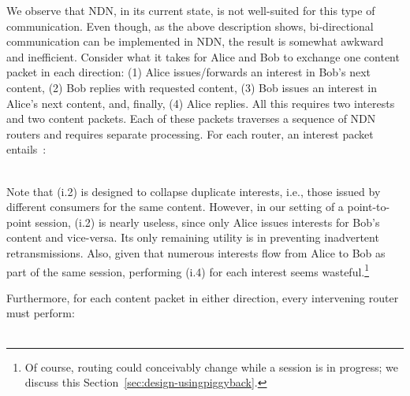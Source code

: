 \documentclass[conference]{IEEEtran}
\begin{document}
We observe that NDN, in its current state, is not well-suited for this type of communication.
Even though, as the above description shows, bi-directional communication can be implemented
in NDN, the result is somewhat awkward and inefficient. Consider what it takes for Alice and Bob
to exchange one content packet
in each direction: (1) Alice issues/forwards an interest in Bob's next content, 
(2) Bob replies with requested content, (3) Bob issues an interest in Alice's next content, and, finally,
(4) Alice replies. All this requires two interests and two content packets. Each of these packets
traverses a sequence of NDN routers and requires separate processing. For each router, 
an interest packet entails~\cite{ccnx-protocol}: \\

\\
\vspace{0.2cm}

Note that (i.2) is designed to collapse duplicate interests, i.e., those issued by different consumers
for the same content. However, in our setting of a point-to-point session, 
(i.2) is nearly useless, since only Alice issues interests for Bob's content and vice-versa.
Its only remaining utility is in preventing inadvertent retransmissions.
Also, given that numerous interests flow from Alice to Bob as part of the same session, 
performing (i.4) for each interest seems wasteful.\footnote{Of course, routing could conceivably 
change while a session is in progress; we discuss this Section~\ref{sec:design-usingpiggyback}. }

Furthermore, for each content packet in either direction, every intervening router must perform: \\


\\
\vspace{0.2cm}
\end{document}
